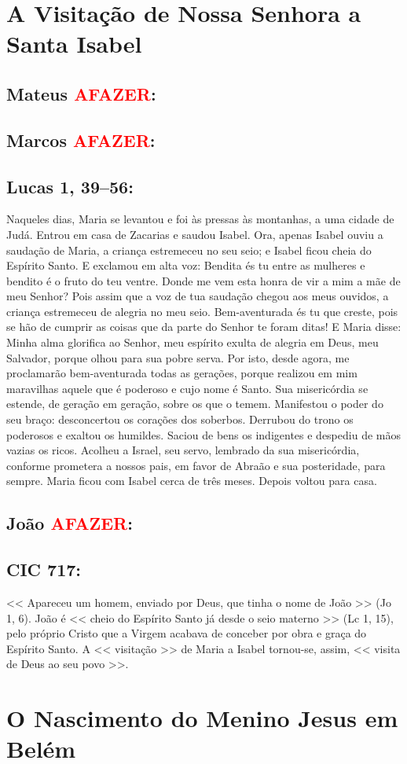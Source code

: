 \documentclass[10pt,a5paper]{book}
\newcommand{\from}[1]{\subsection*{#1}}
\newcommand{\TODO}{\textcolor{red}{\ttfamily AFAZER}}
\begin{document}

\section{A Visitação de Nossa Senhora a Santa Isabel}

\from{Mateus \TODO:}

\from{Marcos \TODO:}

\from{Lucas 1, 39--56:}

Naqueles dias, Maria se levantou e foi às pressas às montanhas, a uma cidade de Judá.
Entrou em casa de Zacarias e saudou Isabel.
Ora, apenas Isabel ouviu a saudação de Maria, a criança estremeceu no seu seio;
e Isabel ficou cheia do Espírito Santo.
E exclamou em alta voz:
Bendita és tu entre as mulheres e bendito é o fruto do teu ventre.
Donde me vem esta honra de vir a mim a mãe de meu Senhor?
Pois assim que a voz de tua saudação chegou aos meus ouvidos, a criança estremeceu de alegria no meu seio.
Bem-aventurada és tu que creste, pois se hão de cumprir as coisas que da parte do Senhor te foram ditas!
E Maria disse:
Minha alma glorifica ao Senhor,
meu espírito exulta de alegria em Deus, meu Salvador,
porque olhou para sua pobre serva.
Por isto, desde agora, me proclamarão bem-aventurada todas as gerações,
porque realizou em mim maravilhas aquele que é poderoso e cujo nome é Santo.
Sua misericórdia se estende, de geração em geração, sobre os que o temem.
Manifestou o poder do seu braço:
desconcertou os corações dos soberbos.
Derrubou do trono os poderosos e exaltou os humildes.
Saciou de bens os indigentes e despediu de mãos vazias os ricos.
Acolheu a Israel, seu servo, lembrado da sua misericórdia,
conforme prometera a nossos pais, em favor de Abraão e sua posteridade, para sempre.
Maria ficou com Isabel cerca de três meses.
Depois voltou para casa.

\from{João \TODO:}

\from{CIC 717:}

<< Apareceu um homem, enviado por Deus, que tinha o nome de João >> (Jo 1, 6).
João é << cheio do Espírito Santo já desde o seio materno >> (Lc 1, 15), pelo próprio Cristo que a Virgem acabava de conceber por obra e graça do Espírito Santo.
A << visitação >> de Maria a Isabel tornou-se, assim, << visita de Deus ao seu povo >>.


\section{O Nascimento do Menino Jesus em Belém}
\end{document}
